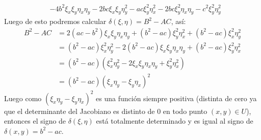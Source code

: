 \begin{homeworkProblem}
\begin{solucion}
\begin{align*}
            &-4b^2\xi_{x}\xi_{y}\eta_{x}\eta_{y}-2bc\xi_{x}\xi_{y}\eta_{y}^2-ac\xi_{y}^2\eta_{x}^2-2bc\xi_{y}^2\eta_{x}\eta_{y}-c^2\xi_{y}^2\eta_{y}^2
        \end{align*}
        Luego de esto podremos calcular $\delta (\xi,\eta)=B^2-AC$, así:
        \begin{align*}
            B^2-AC&=2(ac-b^2)\xi_{x}\xi_{y}\eta_{x}\eta_{y}+(b^2-ac)\xi_{y}^2\eta_{x}^2+(b^2-ac)\xi_{x}^2\eta_{y}^2\\
            &=(b^2-ac)\xi_{x}^2\eta_{y}^2-2(b^2-ac)\xi_{x}\xi_{y}\eta_{x}\eta_{y}+(b^2-ac)\xi_{y}^2\eta_{x}^2\\
            &=(b^2-ac)(\xi_{x}^2\eta_{y}^2-2\xi_{x}\xi_{y}\eta_{x}\eta_{y}+\xi_{y}^2\eta_{x}^2)\\
            &=(b^2-ac)(\xi_{x}\eta_{y}-\xi_{y}\eta_{x})^2
        \end{align*}
        Luego como $(\xi_{x}\eta_{y}-\xi_{y}\eta_{x})^2$ es una función siempre positiva (distinta de cero ya que el determinante del Jacobiano es distinto de $0$ en todo punto $(x,y)\in U$), entonces el signo de $\delta (\xi,\eta)$ está totalmente determinado y es igual al signo de $\delta (x,y)=b^2-ac$.
        \demostrado
\end{solucion}
\end{homeworkProblem}
\newpage

